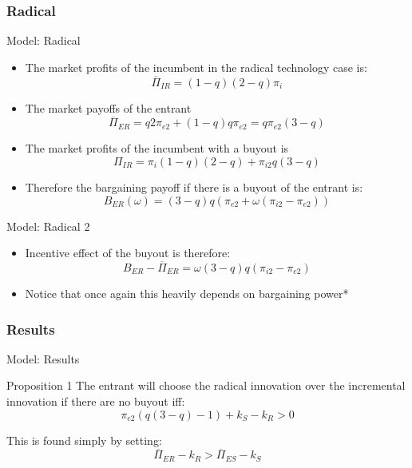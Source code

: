 \documentclass{beamer}
\numberwithin{equation}{section}
\begin{document}
\subsubsection{Radical}

\begin{frame}{Model: Radical}
\begin{itemize}
    \item The market profits of the incumbent in the radical  technology case is:
    \begin{equation*}
       \overline{\Pi}_{IR} = (1-q)(2-q) \pi_{i}
    \end{equation*}
    \item The market payoffs of the entrant 
    \begin{equation*}
\overline{\Pi}_{ER} =
q 2 \pi_{e2}+(1-q)q\pi_{e2}=q\pi_{e2}(3-q)
    \end{equation*}
    \item The market profits of the incumbent with a buyout is
    \begin{equation*}
       \Pi_{IR} = \pi_{i} (1-q) (2-q)+\pi_{i2} q (3-q)
    \end{equation*}
    \item Therefore the bargaining payoff if there is a buyout of the entrant is: 
    \begin{equation*}
       B_{ER}(\omega)=  (3-q)q(\pi_{e2}+\omega  (\pi_{i2} - \pi_{e2}))
    \end{equation*}
\end{itemize}
\end{frame}

\begin{frame}{Model: Radical 2}
\begin{itemize}
    \item Incentive effect of the buyout is therefore:
    \begin{equation*}
B_{ER}-\overline{\Pi}_{ER} 
=\omega (3-q)q 
\left(
\pi_{i2} 
-\pi_{e2}
\right) 
    \end{equation*}
\item Notice that once again this heavily depends on bargaining power*
\end{itemize}
\end{frame}

\subsubsection{Results}

\begin{frame}{Model: Results}
\begin{block}{Proposition 1}
The entrant will choose the radical innovation over the incremental innovation if there are no buyout iff: 
\begin{equation*}
\pi_{e2}(q(3-q)-1)+k_S-k_R > 0
\end{equation*}
\end{block}
This is found simply by setting:
\begin{equation*}
\overline{\Pi}_{ER}-k_R > \overline{\Pi}_{ES}-k_S 
\end{equation*}
\end{frame}
\end{document}
